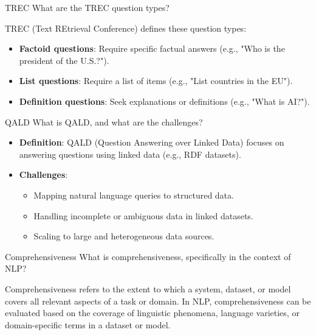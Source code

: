 \documentclass{article}
\begin{document}
\begin{exercise}{TREC}
  What are the TREC question types?

  \begin{solution}
    TREC (Text REtrieval Conference) defines these question types:
    \begin{itemize}
        \item \textbf{Factoid questions}: Require specific factual answers (e.g., "Who is the president of the U.S.?").
        \item \textbf{List questions}: Require a list of items (e.g., "List countries in the EU").
        \item \textbf{Definition questions}: Seek explanations or definitions (e.g., "What is AI?").
    \end{itemize}
  \end{solution}
\end{exercise}

\begin{exercise}{QALD}
  What is QALD, and what are the challenges?

  \begin{solution}
    \begin{itemize}
        \item \textbf{Definition}: QALD (Question Answering over Linked Data) focuses on answering questions using linked data (e.g., RDF datasets).
        \item \textbf{Challenges}:
        \begin{itemize}
            \item Mapping natural language queries to structured data.
            \item Handling incomplete or ambiguous data in linked datasets.
            \item Scaling to large and heterogeneous data sources.
        \end{itemize}
    \end{itemize}
  \end{solution}
\end{exercise}



\setcounter{section}{2020}

\begin{exercise}{Comprehensiveness}
  What is comprehensiveness, specifically in the context of NLP?

  \begin{solution}
    Comprehensiveness refers to the extent to which a system, dataset, or model covers all relevant aspects of a task or domain.
    In NLP, comprehensiveness can be evaluated based on the coverage of linguistic phenomena, language varieties, or domain-specific terms in a dataset or model.
  \end{solution}
\end{exercise}
\end{document}
